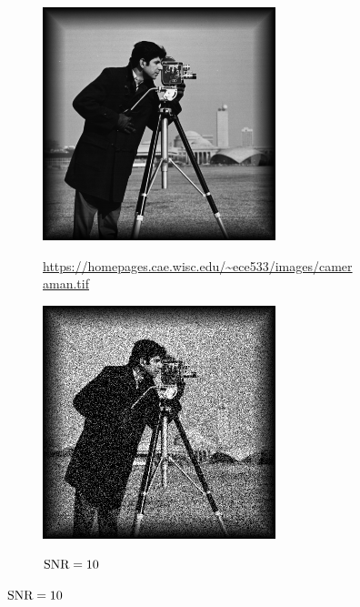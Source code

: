 \begin{figure}[h]
  \centering
  \begin{subfigure}[b]{.4\linewidth}
    \caption{\url{https://homepages.cae.wisc.edu/~ece533/images/cameraman.tif}}
    \includegraphics[width=\linewidth]{pictures/introBeta/cameraman.png}
    \label{fig:camerman}
  \end{subfigure}
  \quad
  \begin{subfigure}[b]{.4\linewidth}
    \caption{$\textup{SNR}=10$}
    \includegraphics[width=\linewidth]{pictures/introBeta/snr10.png}
    \label{fig:camermanSNR10}
  \end{subfigure}


\end{figure}
